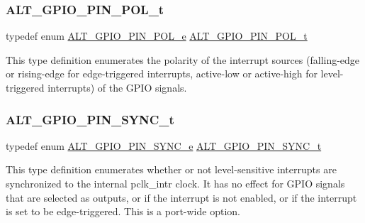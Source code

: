 \subsubsection{\texorpdfstring{ALT\_GPIO\_PIN\_POL\_t}{ALT\_GPIO\_PIN\_POL\_t}}
{\footnotesize\ttfamily typedef enum \mbox{\hyperlink{group__ALT__GPIO__API__CONFIG_ga0b9b54154f761155bf331b3f0e794633}{A\+L\+T\+\_\+\+G\+P\+I\+O\+\_\+\+P\+I\+N\+\_\+\+P\+O\+L\+\_\+e}}  \mbox{\hyperlink{group__ALT__GPIO__API__CONFIG_gac97da06ff658611bcd2b12753dfc4a10}{A\+L\+T\+\_\+\+G\+P\+I\+O\+\_\+\+P\+I\+N\+\_\+\+P\+O\+L\+\_\+t}}}

This type definition enumerates the polarity of the interrupt sources (falling-\/edge or rising-\/edge for edge-\/triggered interrupts, active-\/low or active-\/high for level-\/triggered interrupts) of the G\+P\+IO signals. \mbox{\label{group__ALT__GPIO__API__CONFIG_ga59a09621c4d2fa01dc9d8cc287c11e9a}} 
\subsubsection{\texorpdfstring{ALT\_GPIO\_PIN\_SYNC\_t}{ALT\_GPIO\_PIN\_SYNC\_t}}
{\footnotesize\ttfamily typedef enum \mbox{\hyperlink{group__ALT__GPIO__API__CONFIG_ga77dc8aa651f28ec168db805e9053fe46}{A\+L\+T\+\_\+\+G\+P\+I\+O\+\_\+\+P\+I\+N\+\_\+\+S\+Y\+N\+C\+\_\+e}}  \mbox{\hyperlink{group__ALT__GPIO__API__CONFIG_ga59a09621c4d2fa01dc9d8cc287c11e9a}{A\+L\+T\+\_\+\+G\+P\+I\+O\+\_\+\+P\+I\+N\+\_\+\+S\+Y\+N\+C\+\_\+t}}}

This type definition enumerates whether or not level-\/sensitive interrupts are synchronized to the internal pclk\+\_\+intr clock. It has no effect for G\+P\+IO signals that are selected as outputs, or if the interrupt is not enabled, or if the interrupt is set to be edge-\/triggered. This is a port-\/wide option. \mbox{\label{group__ALT__GPIO__API__CONFIG_gafa3659cf3d59e915a16c591a73258eef}} 
